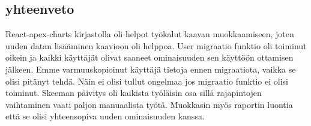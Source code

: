 \subsection*{yhteenveto}

React-apex-charts kirjastolla oli helpot työkalut kaavan muokkaamiseen, joten uuden datan lisääminen kaavioon oli helppoa.
User migraatio funktio oli toiminut oikein ja kaikki käyttäjät olivat saaneet ominaisuuden sen käyttöön ottamisen jälkeen.
Emme varmuuskopioinut käyttäjä tietoja ennen migraatiota, vaikka se olisi pitänyt tehdä. Näin ei olisi tullut ongelmaa jos migraatio funktio ei olisi toiminut.
Skeeman päivitys oli kaikista työläisin osa sillä rajapintojen vaihtaminen vaati paljon manuaalista työtä.
Muokkasin myös raportin luontia että se olisi yhteensopiva uuden ominaisuuden kanssa.




